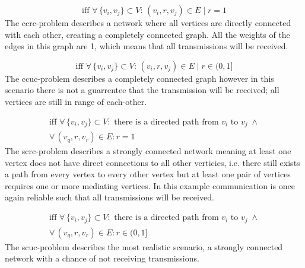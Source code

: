 \begin{description}[labelindent=\parindent,itemsep=2em]
    \item[\gls{ccrc}-problem:]   
    \begin{equation}
		\text{iff } \forall\, \{v_i, v_j\} \subset V: \, (v_i,r,v_j)\in E \mid r = 1    
    \end{equation}
    The \gls{ccrc}-problem describes a network where all vertices are directly connected with each other, creating a completely connected graph.
	All the weights of the edges in this graph are 1, which means that all transmissions will be received. 
    
    \item[\gls{ccuc}-problem:]
    \begin{equation}
		\text{iff } \forall\, \{v_i, v_j\} \subset V: \, (v_i,r,v_j)\in E \mid r \in (0, 1]
    \end{equation}
    The \gls{ccuc}-problem describes a completely connected graph however in this scenario there is not a guarrentee that the transmission will be received; all vertices are still in range of each-other. 
    
    \item[\gls{scrc}-problem:]
    \begin{equation}
		\begin{gathered}
			\text{iff } \forall\, \{v_i, v_j\} \subset V: \text{ there is a directed path from } v_i \text{ to } v_j\; \land \\ \forall\, (v_q, r, v_r) \in E : r = 1
		\end{gathered}  
    \end{equation}   
    The \gls{scrc}-problem describes a strongly connected network meaning at least one vertex does not have direct connections to all other verticies, i.e. there still exists a path from every vertex to every other vertex but at least one pair of vertices requires one or more mediating vertices. 
	In this example communication is once again reliable such that all transmissions will be received. 
    
    \item[\gls{scuc}-problem:]
    \begin{equation}
		\begin{gathered}
			\text{iff } \forall\, \{v_i, v_j\} \subset V: \text{ there is a directed path from } v_i \text{ to } v_j\; \land \\ \forall\, (v_q, r, v_r) \in E : r \in (0, 1]
		\end{gathered}  
    \end{equation}    
    The \gls{scuc}-problem describes the most realistic scenario, a strongly connected network with a chance of not receiving transmissions. 
\end{description}
